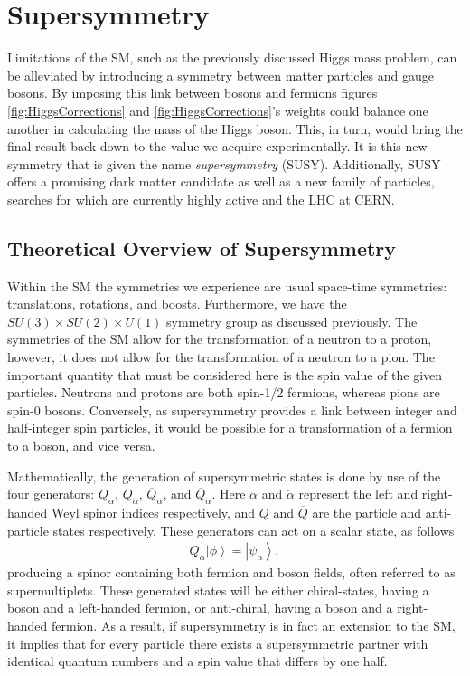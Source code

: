 \documentclass[12pt, oneside]{article}   	%
\begin{document}
\section{Supersymmetry}
Limitations of the SM, such as the previously discussed Higgs mass problem, can be alleviated by introducing a symmetry between matter particles and gauge bosons.
By imposing this link between bosons and fermions figures \ref{fig:HiggsCorrections} and \ref{fig:HiggsCorrections}'s weights could balance one another in calculating the mass of the Higgs boson. 
This, in turn, would bring the final result back down to the value we acquire experimentally.
It is this new symmetry that is given the name \textit{supersymmetry} (SUSY).
Additionally, SUSY offers a promising dark matter candidate as well as a new family of particles, searches for which are currently highly active and the LHC at CERN.

\subsection{Theoretical Overview of Supersymmetry}
Within the SM the symmetries we experience are usual space-time symmetries: translations, rotations, and boosts.
Furthermore, we have the $SU(3) \times SU(2) \times U(1)$ symmetry group as discussed previously.
The symmetries of the SM allow for the transformation of a neutron to a proton, however, it does not allow for the transformation of a neutron to a pion.
The important quantity that must be considered here is the spin value of the given particles.
Neutrons and protons are both spin-1/2 fermions, whereas pions are spin-0 bosons.
Conversely, as supersymmetry provides a link between integer and half-integer spin particles, it would be possible for a transformation of a fermion to a boson, and vice versa.

Mathematically, the generation of supersymmetric states is done by use of the four generators: $Q_{\alpha}$, $Q_{\dot{\alpha}}$, $\overline{Q}_{\alpha}$, and $\overline{Q}_{\dot{\alpha}}$. 
Here $\alpha$ and $\dot{\alpha}$ represent the left and right-handed Weyl spinor indices respectively, and $Q$ and $\overline{Q}$ are the particle and anti-particle states respectively.
These generators can act on a scalar state, as follows
\begin{align}
Q_{\alpha} \left| \phi \right> = \left|\psi_{\alpha}\right>,
\end{align}
producing a spinor containing both fermion and boson fields, often referred to as supermultiplets. 
These generated states will be either chiral-states, having a boson and a left-handed fermion, or anti-chiral, having a boson and a right-handed fermion.
As a result, if supersymmetry is in fact an extension to the SM, it implies that for every particle there exists a supersymmetric partner with identical quantum numbers and a spin value that differs by one half.
\end{document}
